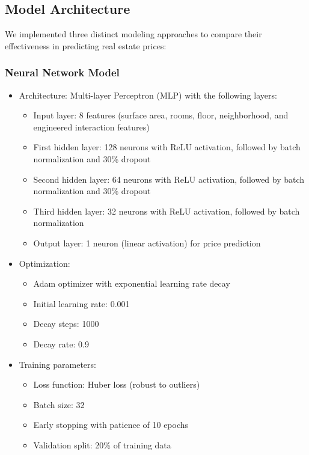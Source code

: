 \documentclass[twocolumn]{article}
\begin{document}
\subsection{Model Architecture}
We implemented three distinct modeling approaches to compare their effectiveness in predicting real estate prices:

\subsubsection{Neural Network Model}
\begin{itemize}
    \item Architecture: Multi-layer Perceptron (MLP) with the following layers:
    \begin{itemize}
        \item Input layer: 8 features (surface area, rooms, floor, neighborhood, and engineered interaction features)
        \item First hidden layer: 128 neurons with ReLU activation, followed by batch normalization and 30\% dropout
        \item Second hidden layer: 64 neurons with ReLU activation, followed by batch normalization and 30\% dropout
        \item Third hidden layer: 32 neurons with ReLU activation, followed by batch normalization
        \item Output layer: 1 neuron (linear activation) for price prediction
    \end{itemize}
    \item Optimization:
    \begin{itemize}
        \item Adam optimizer with exponential learning rate decay
        \item Initial learning rate: 0.001
        \item Decay steps: 1000
        \item Decay rate: 0.9
    \end{itemize}
    \item Training parameters:
    \begin{itemize}
        \item Loss function: Huber loss (robust to outliers)
        \item Batch size: 32
        \item Early stopping with patience of 10 epochs
        \item Validation split: 20\% of training data
    \end{itemize}

\end{itemize}
\end{document}

